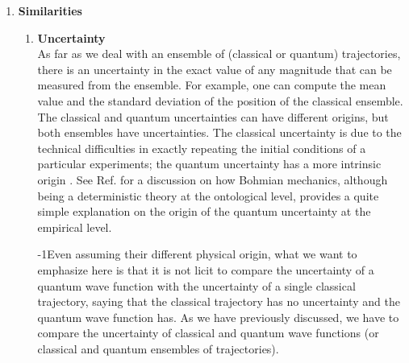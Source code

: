 \documentclass[nofootinbib, secnumarabic, amsmath, nobibnotes,10pt,aps,pra]{revtex4-1}
\newcommand{\fref}[1]{Fig. \ref{#1}}
\newcommand{\eref}[1]{Eq. (\ref{#1})}
\begin{document}
\begin{enumerate}
\begin{enumerate}
{\quad}This surprising result for quantum mechanics can  be
illustrated with the double-slit experiment \cite{om.Dewdney}. We  assume that the initial wave functions
for the classical and quantum ensembles are identical at $t_0 = 0$.
Their difference appears in the time evolution of the trajectories.
For the quantum trajectories of the ensemble, the shape of the
ensemble (whether particles are stopped or not by the double-slit
screen) determines the shape of $R(x,t)$, which will affect the
dynamics of each trajectory, even those trajectories
that are far from the slit (see \fref{om_fig_dobleslit}a). On the
contrary, the classical Hamilton--Jacobi equation,
\eref{om.hamilton_jacobi1D}, is totally independent of $R(x,t)$, so
a single trajectory is completely independent from the rest of
trajectories of other experiments as seen in \fref{om_fig_dobleslit}b.
\end{enumerate}
\item \textbf{Similarities}
\begin{enumerate}
\item \textbf{Uncertainty} \\ As far as we deal with an ensemble of (classical or quantum) trajectories, there is an uncertainty in the exact value of any magnitude that can be measured from the ensemble. For example, one can compute the mean value and the standard deviation of the position of the classical ensemble. The classical and quantum uncertainties can have different origins, but both ensembles have uncertainties. The classical uncertainty is due to the technical difficulties in exactly repeating the initial conditions of a particular experiments; the quantum uncertainty has a more intrinsic origin  \cite{om.extra2,om.extra9}. See Ref. \cite{om.randomness} for a discussion on how Bohmian mechanics, although being a deterministic theory at the ontological level, provides a quite simple explanation on the origin of the quantum uncertainty at the empirical level. 

{\quad}\looseness-1Even assuming their different physical origin, what we want to
emphasize here is  that it is not licit to compare the uncertainty
of a quantum wave function with the uncertainty of a single
classical trajectory, saying that the classical trajectory has no
uncertainty and the quantum wave function has. As we have previously discussed,
we have to compare the uncertainty of classical and quantum wave
functions (or classical and quantum ensembles of trajectories).


\end{enumerate}
\end{enumerate}
\end{document}
